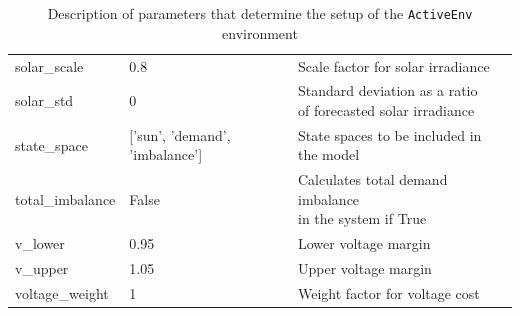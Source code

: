 \documentclass[class=book, crop=false]{standalone}
\begin{document}
{\begin{table}[ht]
\begin{tabular}{lll}
solar\_scale       & 0.8                                                  & Scale factor for solar irradiance                            \\
solar\_std         & 0                                                    & \makecell[l]{Standard deviation as a ratio \\ of forecasted solar irradiance} \\
state\_space       & {[}’sun’, ’demand’, ’imbalance’{]}                   & State spaces to be included in the model                     \\
total\_imbalance   & False                                                & \makecell[l]{Calculates total demand imbalance \\ in the system if True}      \\
v\_lower           & 0.95                                                 & Lower voltage margin                                         \\
v\_upper           & 1.05                                                 & Upper voltage margin                                         \\
voltage\_weight    & 1                                                    & Weight factor for voltage cost                              \\
\hline
\end{tabular}
\caption{Description of parameters that determine the setup of the \texttt{ActiveEnv} environment}
\label{table:implementation:param_description}
\end{table}
}
\end{document}
